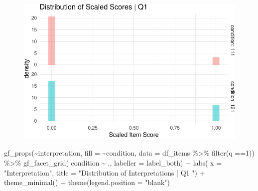 \documentclass[
  letterpaper,
  DIV=11,
  numbers=noendperiod]{scrreprt}
\newenvironment{Shaded}{\begin{snugshade}}{\end{snugshade}}
\newcommand{\AttributeTok}[1]{\textcolor[rgb]{0.40,0.45,0.13}{#1}}
\newcommand{\DecValTok}[1]{\textcolor[rgb]{0.68,0.00,0.00}{#1}}
\newcommand{\FunctionTok}[1]{\textcolor[rgb]{0.28,0.35,0.67}{#1}}
\newcommand{\NormalTok}[1]{\textcolor[rgb]{0.00,0.23,0.31}{#1}}
\newcommand{\SpecialCharTok}[1]{\textcolor[rgb]{0.37,0.37,0.37}{#1}}
\newcommand{\StringTok}[1]{\textcolor[rgb]{0.13,0.47,0.30}{#1}}
\begin{document}
\begin{figure}[H]

{\centering \includegraphics{analysis/SGC3A/2_sgc3A_scoring_files/figure-pdf/Q1-distribution-1.pdf}

}

\end{figure}

\begin{Shaded}
\begin{Highlighting}[]
\FunctionTok{gf\_props}\NormalTok{(}\SpecialCharTok{\textasciitilde{}}\NormalTok{interpretation, }\AttributeTok{fill =} \SpecialCharTok{\textasciitilde{}}\NormalTok{condition, }\AttributeTok{data =}\NormalTok{ df\_items }\SpecialCharTok{\%\textgreater{}\%} \FunctionTok{filter}\NormalTok{(q }\SpecialCharTok{==}\DecValTok{1}\NormalTok{)) }\SpecialCharTok{\%\textgreater{}\%} 
  \FunctionTok{gf\_facet\_grid}\NormalTok{( condition }\SpecialCharTok{\textasciitilde{}}\NormalTok{ ., }\AttributeTok{labeller =}\NormalTok{ label\_both) }\SpecialCharTok{+} 
  \FunctionTok{labs}\NormalTok{( }\AttributeTok{x =} \StringTok{"Interpretation"}\NormalTok{, }\AttributeTok{title =} \StringTok{"Distribution of Interpretations | Q1 "}\NormalTok{) }\SpecialCharTok{+} 
  \FunctionTok{theme\_minimal}\NormalTok{() }\SpecialCharTok{+} \FunctionTok{theme}\NormalTok{(}\AttributeTok{legend.position =} \StringTok{"blank"}\NormalTok{)}
\end{Highlighting}
\end{Shaded}
\end{document}
